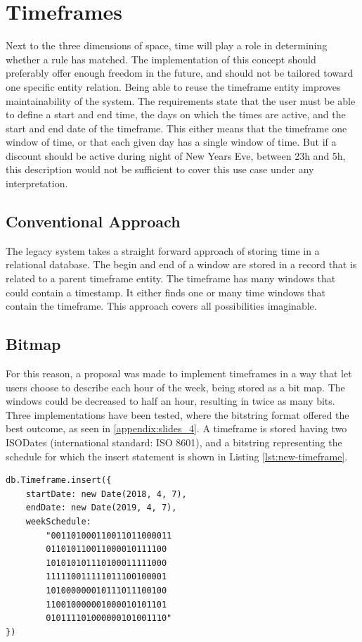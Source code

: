 \section{Timeframes}
Next to the three dimensions of space, time will play a role in determining whether a rule has matched. The implementation of this concept should preferably offer enough freedom in the future, and should not be tailored toward one specific entity relation. Being able to reuse the timeframe entity improves maintainability of the system. The requirements state that the user must be able to define a start and end time, the days on which the times are active, and the start and end date of the timeframe. This either means that the timeframe one window of time, or that each given day has a single window of time. But if a discount should be active during night of New Years Eve, between 23h and 5h, this description would not be sufficient to cover this use case under any interpretation.

\subsection{Conventional Approach}
The legacy system takes a straight forward approach of storing time in a relational database. The begin and end of a window are stored in a record that is related to a parent timeframe entity. The timeframe has many windows that could contain a timestamp. It either finds one or many time windows that contain the timeframe. This approach covers all possibilities imaginable.

\subsection{Bitmap}
For this reason, a proposal was made to implement timeframes in a way that let users choose to describe each hour of the week, being stored as a bit map. The windows could be decreased to half an hour, resulting in twice as many bits. Three implementations have been tested, where the bitstring format offered the best outcome, as seen in \ref{appendix:slides_4}. A timeframe is stored having two ISODates (international standard: ISO 8601), and a bitstring representing the schedule for which the insert statement is shown in Listing \ref{lst:new-timeframe}.

\begin{center}
	\noindent\begin{minipage}{.45\textwidth}
		\begin{lstlisting}[caption={Improved timeframe.}, label={lst:new-timeframe}]
db.Timeframe.insert({
	startDate: new Date(2018, 4, 7),
	endDate: new Date(2019, 4, 7),
	weekSchedule:
		"001101000110011011000011
		011010110011000010111100
		101010101110100011111000
		111110011111011100100001
		101000000010111011100100
		110010000001000010101101
		010111101000000101001110"
})
\end{lstlisting}
	\end{minipage}
\end{center}

